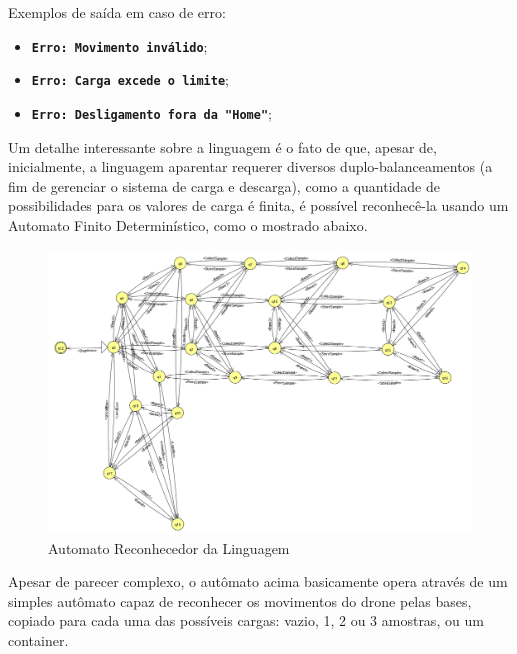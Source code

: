 \documentclass[12pt]{article}
\begin{document}
Exemplos de saída em caso de erro:
\begin{itemize}
    \item \texttt{\textbf{Erro: Movimento inválido}};
    \item \texttt{\textbf{Erro: Carga excede o limite}};
    \item \texttt{\textbf{Erro: Desligamento fora da "Home"}};
\end{itemize}

Um detalhe interessante sobre a linguagem é o fato de que, apesar de, inicialmente, a linguagem aparentar requerer diversos duplo-balanceamentos (a fim de gerenciar o sistema de carga e descarga), como a quantidade de possibilidades para os valores de carga é finita, é possível reconhecê-la usando um Automato Finito Determinístico, como o mostrado abaixo.

\newpage

\begin{figure}[ht]
\centering
\includegraphics[width=\textwidth]{automato.png}
\caption{Automato Reconhecedor da Linguagem}
\label{fig:Automato Reconhecedor}
\end{figure}



Apesar de parecer complexo, o autômato acima basicamente opera através de um simples autômato capaz de reconhecer os movimentos do drone pelas bases, copiado para cada uma das possíveis cargas: vazio, 1, 2 ou 3 amostras, ou um container.
\end{document}
